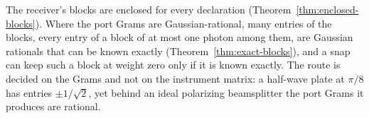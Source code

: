 
The receiver's blocks are enclosed for every declaration
(Theorem~\ref{thm:enclosed-blocks}). Where the port Grams are
Gaussian-rational, many entries of the blocks, every entry of a block of at
most one photon among them, are Gaussian rationals that can be known exactly
(Theorem~\ref{thm:exact-blocks}), and a snap can keep such a block at weight
zero only if it is known exactly. The route is decided on the Grams and not
on the instrument matrix: a half-wave plate at $\pi/8$ has entries
$\pm1/\sqrt2$, yet behind an ideal polarizing beamsplitter the port Grams it
produces are rational.


